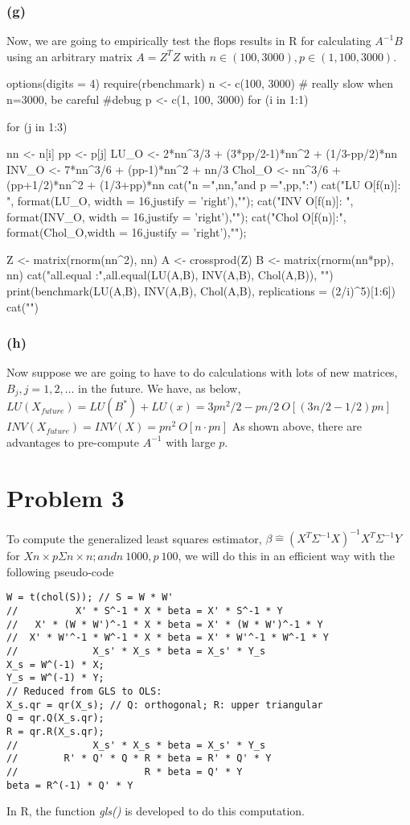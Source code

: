 \documentclass{article}
\begin{document}
\subsubsection*{(g)}
Now, we are going to empirically test the flops results in R for calculating $A^{-1}B$ using
an arbitrary matrix $A=Z^TZ$ with $n\in (100,3000), p\in (1,100,3000)$.

options(digits = 4)
require(rbenchmark)
n <- c(100, 3000) # really slow when n=3000, be careful  #debug
p <- c(1, 100, 3000)
for (i in 1:1){ 
	for (j in 1:3){
		nn <- n[i]
		pp <- p[j]
		LU_O   <- 2*nn^3/3 + (3*pp/2-1)*nn^2 + (1/3-pp/2)*nn
		INV_O  <- 7*nn^3/6 + (pp-1)*nn^2 + nn/3
		Chol_O <- nn^3/6 + (pp+1/2)*nn^2 + (1/3+pp)*nn
		cat("n =",nn,"and p =",pp,":\n")
		cat("LU O[f(n)]:  ", format(LU_O,  width = 16,justify = 'right'),"\n");
		cat("INV O[f(n)]: ", format(INV_O, width = 16,justify = 'right'),"\n");
		cat("Chol O[f(n)]:", format(Chol_O,width = 16,justify = 'right'),"\n"); 

		Z <- matrix(rnorm(nn^2), nn)
		A <- crossprod(Z) 
		B <- matrix(rnorm(nn*pp), nn) 
		cat("all.equal :",all.equal(LU(A,B), INV(A,B), Chol(A,B)), "\n")
		print(benchmark(LU(A,B), INV(A,B), Chol(A,B), replications = (2/i)^5)[1:6])
		cat("\n")
	}
}

\subsubsection*{(h)}
Now suppose we are going to have to do calculations with lots of new matrices, $B_j, j=1,2,...$
in the future. We have, as below,
\newline
$LU(X_{future}) = LU(B^*) + LU(x) = 3pn^2/2 -pn/2 ~ O[(3n/2-1/2)pn]$
\newline
$INV(X_{future}) = INV(X) = pn^2 ~O[n\cdot pn]$
\newline
As shown above, there are advantages to pre-compute $A^{-1}$ with large $p$.


\newpage
\section*{Problem 3}
To compute the generalized least squares estimator, 
$\beta\hat = (X^T\Sigma^{-1}X)^{-1}X^T\Sigma^{-1}Y$
for $X n\times p \Sigma n\times n; and n~1000, p~100$, we will
do this in an efficient way with the following pseudo-code

\begin{lstlisting}
W = t(chol(S)); // S = W * W'
//          X' * S^-1 * X * beta = X' * S^-1 * Y
//   X' * (W * W')^-1 * X * beta = X' * (W * W')^-1 * Y
//  X' * W'^-1 * W^-1 * X * beta = X' * W'^-1 * W^-1 * Y
//             X_s' * X_s * beta = X_s' * Y_s			
X_s = W^(-1) * X;
Y_s = W^(-1) * Y;
// Reduced from GLS to OLS:
X_s.qr = qr(X_s); // Q: orthogonal; R: upper triangular
Q = qr.Q(X_s.qr);  
R = qr.R(X_s.qr); 
//             X_s' * X_s * beta = X_s' * Y_s			
//        R' * Q' * Q * R * beta = R' * Q' * Y
//                      R * beta = Q' * Y
beta = R^(-1) * Q' * Y
\end{lstlisting}
In R, the function \textit{gls()} is developed to do this computation.
\end{document}
